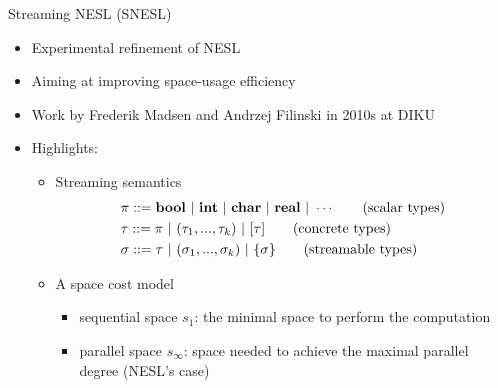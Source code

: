 \documentclass{beamer}
\begin{document}
\begin{frame}{Streaming NESL (SNESL)}
	\begin{itemize}
		\item Experimental refinement of NESL
		\item Aiming at improving space-usage efficiency 
		\item Work by Frederik Madsen and Andrzej Filinski in 2010s at DIKU
		\item Highlights:
		\begin{itemize}
			\item Streaming semantics 
			\begin{align*} 
			& \pi ::= \bool \ | \ \int \ | \ \*{char} \ | \ \*{real}  \ | \ \cdots \tag{scalar types}\\
			& \tau ::= \pi \ | \ (\tau_1,...,\tau_k) \ | \ [\tau] \tag{concrete types} \\
			& \sigma ::= \tau \ | \ (\sigma_1,...,\sigma_k) \ | \ \tseq{\sigma}  \tag{streamable types} 
			\end{align*}
			
			\item A space cost model
			\begin{itemize}
				\item sequential space $s_1$: the minimal space to perform the computation
				\item parallel space $s_\infty$: space needed to achieve the maximal parallel degree (NESL's case)
			\end{itemize}
		\end{itemize}
	\end{itemize}
\end{frame}
\end{document}
